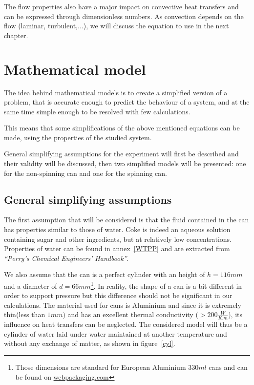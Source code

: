 \documentclass{report}
\begin{document}
	The flow properties also have a major impact on convective heat transfers and can be expressed through dimensionless numbers.
	As convection depends on the flow (laminar, turbulent,...), we will discuss the equation to use in the next chapter.
	
	\chapter{Mathematical model}\label{mm}
	
	The idea behind mathematical models is to create a simplified version of a problem, that is accurate enough to predict the behaviour of a system, and at the same time simple enough to be resolved with few calculations.
	
	This means that some simplifications of the above mentioned equations can be made, using the properties of the studied system.
	
	General simplifying assumptions for the experiment will first be described and their validity will be discussed, then two simplified models will be presented: one for the non-spinning can and one for the spinning can.
	
	\section{General simplifying assumptions}\label{gsa}
	
	The first assumption that will be considered is that the fluid contained in the can has properties similar to those of water. Coke is indeed an aqueous solution containing sugar and other ingredients, but at relatively low concentrations.
	Properties of water can be found in annex~\ref{WTPP} and are extracted from \emph{``Perry’s Chemical Engineers’ Handbook''\cite{properties}}.
	
	We also assume that the can is a perfect cylinder with an height of $h=116mm$ and a diameter of $d=66mm$\footnote{Those dimensions are standard for European Aluminium $330ml$ cans and can be found on \hyperref{http://www.webpackaging.com/en/portals/rexam/assets/11059498/spec-alu-202/}{}{}{webpackaging.com}}. In reality, the shape of a can is a bit different in order to support pressure but this difference should not be significant in our calculations. The material used for cans is Aluminium and since it is extremely thin(less than $1mm$) and has an excellent thermal conductivity ($>200\frac{W}{K.m}$), its influence on heat transfers can be neglected. The considered model will thus be a cylinder of water laid under water maintained at another temperature and without any exchange of matter, as shown in figure~\ref{cyl}.
	
\end{document}
